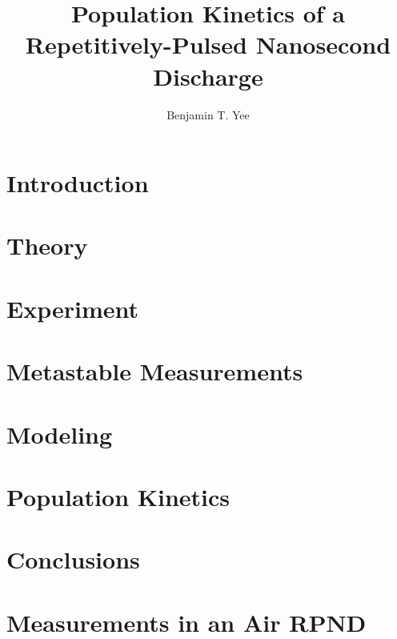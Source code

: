 \documentclass[12pt]{./tex/thesis-umich}
\title{Population Kinetics of a Repetitively-Pulsed Nanosecond Discharge}
\author{Benjamin T. Yee}
\begin{document}
  \chapter{Introduction}\label{chp:introduction}
    
  
  \chapter{Theory}\label{chp:theory}
    

  \chapter{Experiment}\label{chp:experiment}
    

  \chapter{Metastable Measurements}\label{chp:metastables}
    
  
  \chapter{Modeling}\label{chp:modeling}
    

  \chapter{Population Kinetics}\label{chp:emissions}

  \chapter{Conclusions}\label{chp:conclusions}

  \appendix
    \chapter{Measurements in an Air RPND}\label{chp:nasa}
      


  
  
\end{document}
